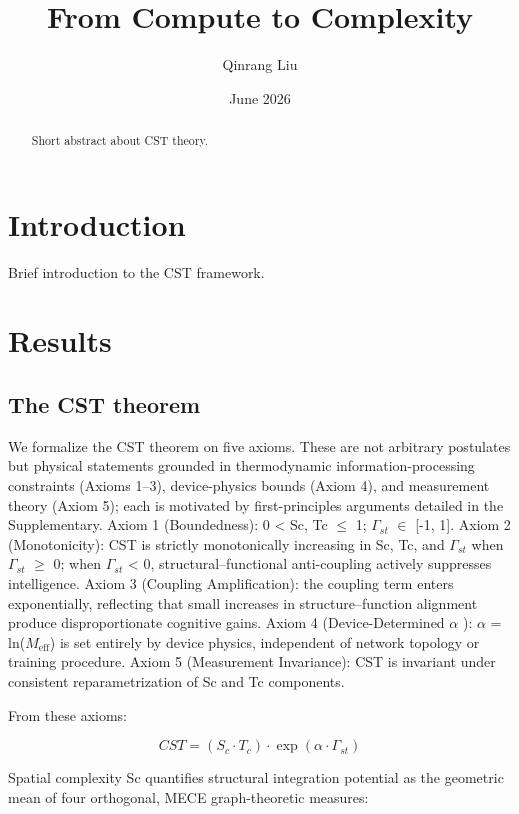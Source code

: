 \documentclass[a4paper,12pt]{article}
\title{From Compute to Complexity}
\author{Qinrang Liu}
\date{June 2026}
\begin{document}
\maketitle
\begin{abstract}
Short abstract about CST theory.
\end{abstract}
\section{Introduction}
Brief introduction to the CST framework.

\section{Results}

\subsection{The CST theorem}

We formalize the CST theorem on five axioms.
These are not arbitrary postulates but physical statements grounded in thermodynamic information-processing constraints (Axioms 1--3), device-physics bounds (Axiom 4), and measurement theory (Axiom 5); each is motivated by first-principles arguments detailed in the Supplementary.
Axiom 1 (Boundedness): 0 < Sc, Tc $\leq$ 1; $\Gamma_{st}$  $\in$  [-1, 1].
Axiom 2 (Monotonicity): CST is strictly monotonically increasing in Sc, Tc, and $\Gamma_{st}$ when $\Gamma_{st}$  $\geq$  0; when $\Gamma_{st}$ < 0, structural--functional anti-coupling actively suppresses intelligence.
Axiom 3 (Coupling Amplification): the coupling term enters exponentially, reflecting that small increases in structure--function alignment produce disproportionate cognitive gains.
Axiom 4 (Device-Determined  $\alpha$ ):  $\alpha$  = ln($M_{\text{eff}}$) is set entirely by device physics, independent of network topology or training procedure.
Axiom 5 (Measurement Invariance): CST is invariant under consistent reparametrization of Sc and Tc components.

From these axioms:

\begin{equation}
CST = (S_c \cdot T_c) \cdot \exp(\alpha \cdot \Gamma_{st}) \tag{1}
\end{equation}

Spatial complexity Sc quantifies structural integration potential as the geometric mean of four orthogonal, MECE graph-theoretic measures:
\end{document}
